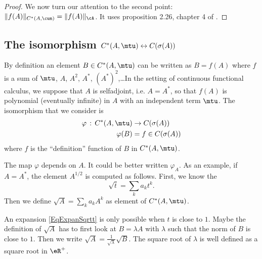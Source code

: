 \begin{proof}
We now turn our attention to the second point: $\| f(A) \|_{C^*(A,\cun)}=\| f(A) \|_{\cA}$. It uses proposition 2.26, chapter 4 of \cite{LaHarpe}.

\end{proof}

\subsection{The isomorphism \texorpdfstring{$C^*(A,\mtu)\leftrightarrow C(\sigma(A))$}{AAm AsA}}

By definition an element $B\in C^*(A,\mtu)$ can be written as $B=f(A)$ where $f$ is a sum of $\mtu$, $A$, $A^2$, $A^*$, $(A^*)^2$,\ldots In the setting of continuous functional calculus, we suppose that $A$ is selfadjoint, i.e. $A=A^*$, so that $f(A)$ is polynomial (eventually infinite) in $A$ with an independent term $\mtu$. The isomorphism that we consider is 
\begin{equation}
\begin{aligned}
 \varphi\,:\,C^*(A,\mtu)&\to C(\sigma(A))\\
    \varphi(B)&=f\in C(\sigma(A))
\end{aligned}
\end{equation}
where $f$ is the ``definition'' function of $B$ in $C^*(A,\mtu)$. 

\begin{remark}      \label{RemExpansionSqrtConCal}
    The map $\varphi$ depends on $A$. It could be better written $\varphi_A$. As an example, if $A=A^*$, the element $A^{1/2}$ is computed as follows. First, we know the 
    \begin{equation}        \label{EqExpanSqrtt}
        \sqrt{t}=\sum_ka_kt^k.
    \end{equation}
    Then we define $\sqrt{A}=\sum_k a_kA^k$ as element of $C^*(A,\mtu)$.
\end{remark}

\begin{probleme}
    An expansion \eqref{EqExpanSqrtt} is only possible when $t$ is close to $1$. Maybe the definition of $\sqrt{A}$ has to first look at $B=\lambda A$ with $\lambda$ such that the norm of $B$ is close to $1$. Then we write $\sqrt{A}=\frac{1}{ \sqrt{\lambda} }\sqrt{B}$. The square root of $\lambda$ is well defined as a square root in $\eR^+$.
\end{probleme}


